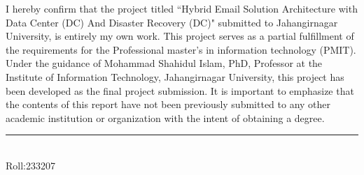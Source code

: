 I hereby confirm that the project titled “Hybrid Email Solution Architecture with Data Center (DC) And Disaster Recovery (DC)" submitted to Jahangirnagar University, is entirely my own work. This project serves as a partial fulfillment of the requirements for the Professional master’s in information technology (PMIT). Under the guidance of Mohammad Shahidul Islam, PhD, Professor at the Institute of Information Technology, Jahangirnagar University, this project has been developed as the final project submission. It is important to emphasize that the contents of this report have not been previously submitted to any other academic institution or organization with the intent of obtaining a degree.

\vspace{1in}


\noindent   \rule{3.5cm}{1pt} \\
   Roll:233207 \\


